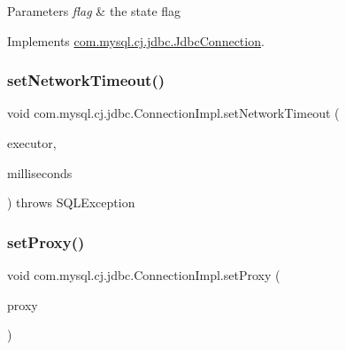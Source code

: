 \begin{DoxyParams}{Parameters}
{\em flag} & the state flag \\
\hline
\end{DoxyParams}


Implements \mbox{\hyperlink{interfacecom_1_1mysql_1_1cj_1_1jdbc_1_1_jdbc_connection_af7cff3ba67d2b787b04c3eff40f9e087}{com.\+mysql.\+cj.\+jdbc.\+Jdbc\+Connection}}.

\mbox{\label{classcom_1_1mysql_1_1cj_1_1jdbc_1_1_connection_impl_a6362368463038a6c7d9b2be89691be8d}} 
\subsubsection{\texorpdfstring{set\+Network\+Timeout()}{setNetworkTimeout()}}
{\footnotesize\ttfamily void com.\+mysql.\+cj.\+jdbc.\+Connection\+Impl.\+set\+Network\+Timeout (\begin{DoxyParamCaption}\item[{Executor}]{executor,  }\item[{final int}]{milliseconds }\end{DoxyParamCaption}) throws S\+Q\+L\+Exception}

\mbox{\label{classcom_1_1mysql_1_1cj_1_1jdbc_1_1_connection_impl_a2fd722cbf9248f2d11b194cd5a91441f}} 
\subsubsection{\texorpdfstring{set\+Proxy()}{setProxy()}}
{\footnotesize\ttfamily void com.\+mysql.\+cj.\+jdbc.\+Connection\+Impl.\+set\+Proxy (\begin{DoxyParamCaption}\item[{\mbox{\hyperlink{interfacecom_1_1mysql_1_1cj_1_1jdbc_1_1_jdbc_connection}{Jdbc\+Connection}}}]{proxy }\end{DoxyParamCaption})}



